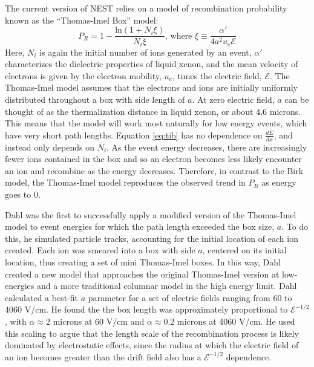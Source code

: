 The current version of NEST relies on a model of recombination probability known as the ``Thomas-Imel Box'' model\cite{nest1,nest3,tib1,tib2}:
\begin{equation}\label{eq:tib}
P_R=1-\frac{\text{ln}(1+N_i\xi)}{N_i \xi} \text{,  where  } \xi \equiv \frac{\alpha'}{4a^2u_e\mathcal{E}}
\end{equation}
Here, $N_i$ is again the initial number of ions generated by an event, $\alpha'$ characterizes the dielectric properties of liquid xenon, and the mean velocity of electrons is given by the electron mobility, $u_e$, times the electric field, $\mathcal{E}$\cite{dahl}. The Thomas-Imel model assumes that the electrons and ions are initially uniformly distributed throughout a box with side length of $a$. At zero electric field, $a$ can be thought of as the thermalization distance in liquid xenon, or about 4.6 microns\cite{nest1}. This means that the model will work most naturally for low energy events, which have very short path lengths. Equation \ref{eq:tib} has no dependence on $\frac{dE}{dx}$, and instead only depends on $N_i$. As the event energy decreases, there are increasingly fewer ions contained in the box and so an electron becomes less likely encounter an ion and recombine as the energy decreases. Therefore, in contrast to the Birk model, the Thomas-Imel model reproduces the observed trend in $P_R$ as energy goes to 0. 

Dahl was the first to successfully apply a modified version of the Thomas-Imel model to event energies for which the path length exceeded the box size, $a$. To do this, he simulated particle tracks, accounting for the initial location of each ion created. Each ion was smeared into a box with side $a$, centered on its initial location, thus creating a set of mini Thomas-Imel boxes. In this way, Dahl created a new model that approaches the original Thomas-Imel version at low-energies and a more traditional columnar model in the high energy limit. Dahl calculated a best-fit $a$ parameter for a set of electric fields ranging from 60 to 4060 V/cm. He found the the box length was approximately proportional to $\mathcal{E}^{-1/2}$, with $\alpha \approx 2$ microns at 60 V/cm and $\alpha \approx 0.2$ microns at 4060 V/cm. He used this scaling to argue that the length scale of the recombination process is likely dominated by electrostatic effects, since the radius at which the electric field of an ion becomes greater than the drift field also has a $\mathcal{E}^{-1/2}$ dependence\cite{dahl}.

